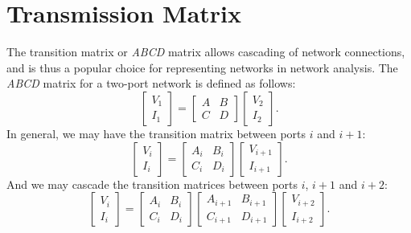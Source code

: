 \documentclass{article}
\begin{document}
	\section{Transmission Matrix}
The transition matrix or \emph{ABCD} matrix allows cascading of network connections, and is thus a popular choice for representing networks in network analysis. The \emph{ABCD} matrix for a two-port network is defined as follows:
\begin{equation}
	\begin{bmatrix}
		V_1\\
		I_1
	\end{bmatrix}=
	\begin{bmatrix}
		A&B\\
		C&D
	\end{bmatrix}
	\begin{bmatrix}
		V_2\\
		I_2
	\end{bmatrix}.
\end{equation}
In general, we may have the transition matrix between ports $i$ and $i+1$:
\begin{equation}
	\begin{bmatrix}
		V_i\\
		I_i
	\end{bmatrix}=
	\begin{bmatrix}
		A_i&B_i\\
		C_i&D_i
	\end{bmatrix}
	\begin{bmatrix}
		V_{i+1}\\
		I_{i+1}
	\end{bmatrix}.
\end{equation}
And we may cascade the transition matrices between ports $i$, $i+1$ and $i+2$:
\begin{equation}
	\begin{bmatrix}
		V_i\\
		I_i
	\end{bmatrix}=
	\begin{bmatrix}
		A_i&B_i\\
		C_i&D_i
	\end{bmatrix}
	\begin{bmatrix}
		A_{i+1}&B_{i+1}\\
		C_{i+1}&D_{i+1}
	\end{bmatrix}	
	\begin{bmatrix}
		V_{i+2}\\
		I_{i+2}
	\end{bmatrix}.
\end{equation}
\end{document}
